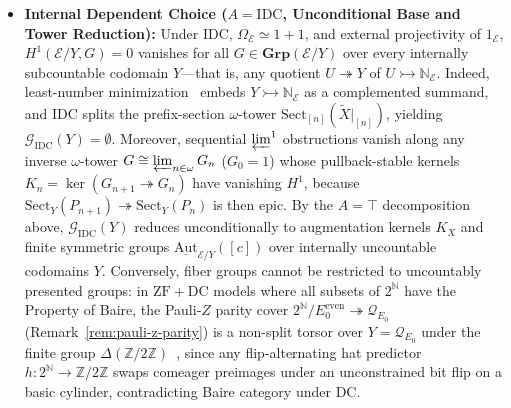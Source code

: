 \documentclass[10pt,twoside,openright]{book}
\theoremstyle{crmplain}
\theoremstyle{crmdef}
\theoremstyle{crmremark}
\begin{document}
\begin{itemize}[leftmargin=1.5em]
  \item \textbf{Internal Dependent Choice ($A = \mathrm{IDC}$, Unconditional Base and Tower Reduction):} Under $\mathrm{IDC}$, $\Omega_{\mathcal{E}} \simeq 1+1$, and external projectivity of $1_{\mathcal{E}}$, $H^1(\mathcal{E}/Y, G) = 0$ vanishes for all $G \in \mathbf{Grp}(\mathcal{E}/Y)$ over every internally subcountable codomain $Y$---that is, any quotient $U \twoheadrightarrow Y$ of $U \rightarrowtail \mathbb{N}_{\mathcal{E}}$. Indeed, least-number minimization~\cite[\S D5.1]{Johnstone02} embeds $Y \rightarrowtail \mathbb{N}_{\mathcal{E}}$ as a complemented summand, and $\mathrm{IDC}$ splits the prefix-section $\omega$-tower $\mathrm{Sect}_{[n]}(\widetilde{X}|_{[n]})$, yielding $\mathcal{G}_{\mathrm{IDC}}(Y) = \emptyset$. Moreover, sequential $\varprojlim^1$ obstructions vanish along any inverse $\omega$-tower $G \cong \varprojlim_{n \in \omega} G_n$ ($G_0 = 1$) whose pullback-stable kernels $K_n = \ker(G_{n+1} \twoheadrightarrow G_n)$ have vanishing $H^1$, because $\mathrm{Sect}_Y(P_{n+1}) \twoheadrightarrow \mathrm{Sect}_Y(P_n)$ is then epic. By the $A = \top$ decomposition above, $\mathcal{G}_{\mathrm{IDC}}(Y)$ reduces unconditionally to augmentation kernels $K_X$ and finite symmetric groups $\underline{\mathrm{Aut}}_{\mathcal{E}/Y}([c])$ over internally uncountable codomains $Y$. Conversely, fiber groups cannot be restricted to uncountably presented groups: in $\mathrm{ZF} + \mathrm{DC}$ models where all subsets of $2^{\mathbb{N}}$ have the Property of Baire, the Pauli-$Z$ parity cover $2^{\mathbb{N}}/E_0^{\mathrm{even}} \twoheadrightarrow \mathcal{Q}_{E_0}$ (Remark~\ref{rem:pauli-z-parity}) is a non-split torsor over $Y = \mathcal{Q}_{E_0}$ under the finite group $\Delta(\mathbb{Z}/2\mathbb{Z})$~\cite{Serafin23}, since any flip-alternating hat predictor $h : 2^{\mathbb{N}} \to \mathbb{Z}/2\mathbb{Z}$ swaps comeager preimages under an unconstrained bit flip on a basic cylinder, contradicting Baire category under $\mathrm{DC}$.


\end{itemize}
\end{document}
